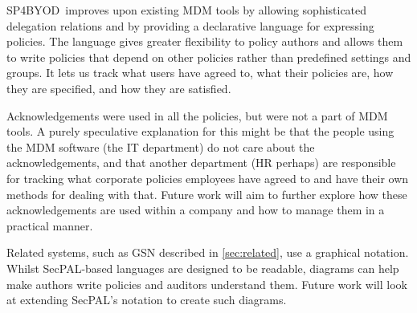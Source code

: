 \documentclass{llncs}
\newcommand{\AppPAL}[0]{SP4BYOD}
\begin{document}
\AppPAL~improves upon existing MDM tools by allowing sophisticated delegation relations and by providing a declarative language for expressing policies.
The language gives greater flexibility to policy authors and allows them to write policies that depend on other policies rather than predefined settings and groups.
It lets us track what users have agreed to, what their policies are, how they are specified, and how they are satisfied.

Acknowledgements were used in all the policies, but were not a part of \ac{MDM} tools.
A purely speculative explanation for this might be that the people using the \ac{MDM} software (the IT department) do not care about the acknowledgements, and that another department (HR perhaps) are responsible for tracking what corporate policies employees have agreed to and have their own methods for dealing with that.
Future work will aim to further explore how these acknowledgements are used within a company and how to manage them in a practical manner.

Related systems, such as \ac{GSN} described in \autoref{sec:related}, use a graphical notation.
Whilst SecPAL-based languages are designed to be readable, diagrams can help make authors write policies and auditors understand them.
Future work will look at extending SecPAL's notation to create such diagrams.

%
\printbibliography
\end{document}
